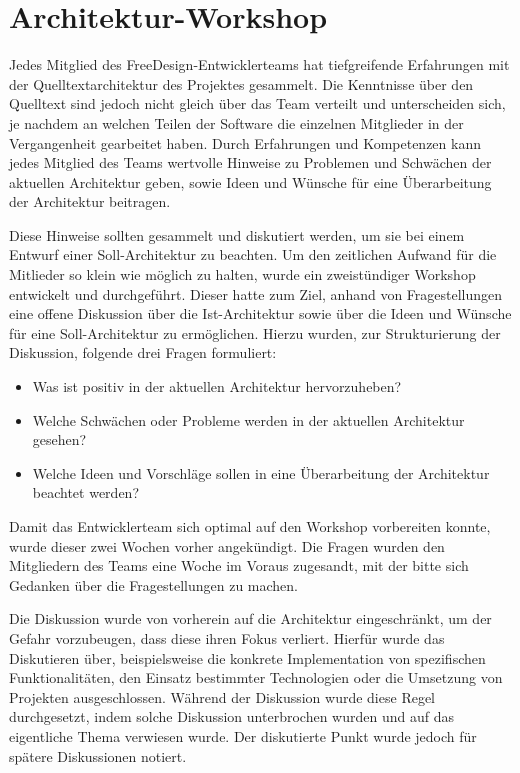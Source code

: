 \section{Architektur-Workshop}
Jedes Mitglied des FreeDesign-Entwicklerteams hat tiefgreifende Erfahrungen mit der Quelltextarchitektur des Projektes gesammelt. 
Die Kenntnisse über den Quelltext sind jedoch nicht gleich über das Team verteilt und unterscheiden sich, je nachdem an welchen Teilen der Software die einzelnen Mitglieder in der Vergangenheit gearbeitet haben.
Durch Erfahrungen und Kompetenzen kann jedes Mitglied des Teams wertvolle Hinweise zu Problemen und Schwächen der aktuellen Architektur geben, sowie Ideen und Wünsche für eine Überarbeitung der Architektur beitragen.

Diese Hinweise sollten gesammelt und diskutiert werden, um sie bei einem Entwurf einer Soll-Architektur zu beachten. Um den zeitlichen Aufwand für die Mitlieder so klein wie möglich zu halten, wurde ein zweistündiger Workshop entwickelt und durchgeführt. Dieser hatte zum Ziel, anhand von Fragestellungen eine offene Diskussion über die Ist-Architektur sowie über die Ideen und Wünsche für eine Soll-Architektur zu ermöglichen. 
Hierzu wurden, zur Strukturierung der Diskussion, folgende drei Fragen formuliert: 
\begin{itemize}
	\item Was ist positiv in der aktuellen Architektur hervorzuheben?
	\item Welche Schwächen oder Probleme werden in der aktuellen Architektur gesehen?
	\item Welche Ideen und Vorschläge sollen in eine Überarbeitung der Architektur beachtet werden?
\end{itemize}
Damit das Entwicklerteam sich optimal auf den Workshop vorbereiten konnte, wurde dieser zwei Wochen vorher angekündigt. Die Fragen wurden den Mitgliedern des Teams eine Woche im Voraus zugesandt, mit der bitte sich Gedanken über die Fragestellungen zu machen.  

Die Diskussion wurde von vorherein auf die Architektur eingeschränkt, um der Gefahr vorzubeugen, dass diese ihren Fokus verliert. Hierfür wurde das Diskutieren über, beispielsweise die konkrete Implementation von spezifischen Funktionalitäten, den Einsatz bestimmter Technologien oder die Umsetzung von Projekten ausgeschlossen. Während der Diskussion wurde diese Regel durchgesetzt, indem solche Diskussion unterbrochen wurden und auf das eigentliche Thema verwiesen wurde. Der diskutierte Punkt wurde jedoch für spätere Diskussionen notiert.
